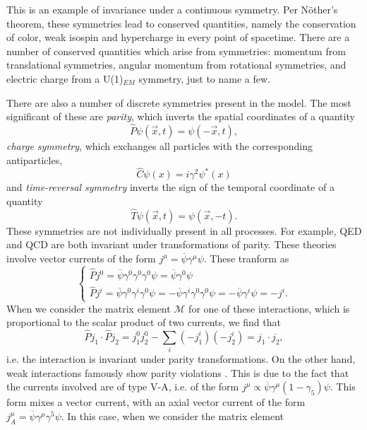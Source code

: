 \documentclass[10pt,a4paper]{book}
\begin{document}
This is an example of invariance under a continuous symmetry. Per N\"{o}ther's theorem, these symmetries lead to conserved quantities, namely the conservation of color, weak isospin and hypercharge in every point of spacetime. There are a number of conserved quantities which arise from symmetries: momentum from translational symmetries, angular momentum from rotational symmetries, and electric charge from a U(1)$_{EM}$ symmetry, just to name a few.

There are also a number of discrete symmetries present in the model. The most significant of these are \emph{parity}, which inverts the spatial coordinates of a quantity
\begin{equation}
\hat{P}\psi(\vec{x}, t) = \psi(-\vec{x}, t),
\end{equation}
\emph{charge symmetry}, which exchanges all particles with the corresponding antiparticles,
\begin{equation}
\hat{C}\psi(x) = i\gamma^2\psi^*(x)
\end{equation}
and \emph{time-reversal symmetry} inverts the sign of the temporal coordinate of a quantity
\begin{equation}
\hat{T}\psi(\vec{x}, t) = \psi(\vec{x}, -t).
\end{equation}
These symmetries are not individually present in all processes. For example, QED and QCD are both invariant under transformations of parity. These theories involve vector currents of the form $j^\mu = \overline{\psi}\gamma^\mu \psi$. These tranform as
\begin{equation}
\begin{cases}
\hat{P}j^{0} = \overline{\psi}\gamma^{0}\gamma^{0}\gamma^{0}\psi = \overline{\psi}\gamma^{0}\psi\\
\hat{P}j^{i} = \overline{\psi}\gamma^{0}\gamma^{i}\gamma^{0}\psi = -\overline{\psi}\gamma^{i}\gamma^{0}\gamma^{0}\psi = -\overline{\psi}\gamma^{i}\psi = -j^{i}.
\end{cases}
\end{equation}
When we consider the matrix element $\mathcal{M}$ for one of these interactions, which is proportional to the scalar product of two currents, we find that
\begin{equation}
\hat{P}j_{1} \cdot \hat{P}j_{2} = j^{0}_{1}j^{0}_{2} - \sum_{i}\left(-j^{i}_{1}\right)\left(-j^{i}_{2}\right) = j_{1} \cdot j_{2},
\end{equation}
i.e. the interaction is invariant under parity transformations.
On the other hand, weak interactions famously show parity violations \cite{PhysRev.105.1413}. This is due to the fact that the currents involved are of type V-A, i.e. of the form $j^\mu \propto \overline{\psi}\gamma^\mu\left(1 - \gamma_5\right)\psi$. This form mixes a vector current, with an axial vector current of the form $j^\mu_A = \overline{\psi}\gamma^\mu\gamma^5\psi$. In this case, when we consider the matrix element
\end{document}
